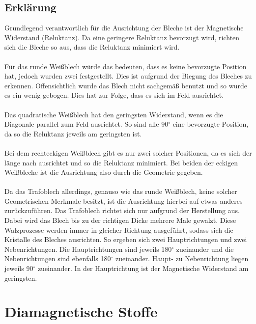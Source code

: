\documentclass[a4paper,twoside,12pt,DIV=13,BCOR=5mm,numbers=noenddot,cleardoublepage=empty]{scrbook}
\begin{document}
        \subsection{Erkl\"arung}
        Grundlegend verantwortlich f\"ur die Ausrichtung der Bleche ist der Magnetische Widerstand (Reluktanz). Da eine geringere Reluktanz bevorzugt wird, richten sich die Bleche so aus, dass die Reluktanz minimiert wird. 
        \\
        \\
        F\"ur das runde Wei\ss{}blech w\"urde das bedeuten, dass es keine bevorzugte Position hat, jedoch wurden zwei festgestellt. Dies ist aufgrund der Biegung des Bleches zu erkennen. Offensichtlich wurde das Blech nicht sachgem\"a\ss{} benutzt und so wurde es ein wenig gebogen. Dies hat zur Folge, dass es sich im Feld ausrichtet.
        \\
        \\
        Das quadratische Wei\ss{}blech hat den geringsten Widerstand, wenn es die Diagonale parallel zum Feld ausrichtet. So sind alle 90$^{\circ}$ eine bevorzugte Position, da so die Reluktanz jeweils am geringsten ist.
        \\
        \\
        Bei dem rechteckigen Wei\ss{}blech gibt es nur zwei solcher Positionen, da es sich der l\"ange nach ausrichtet und so die Reluktanz minimiert. Bei beiden der eckigen Wei\ss{}bleche ist die Ausrichtung also durch die Geometrie gegeben.
        \\
        \\
        Da das Trafoblech allerdings, genauso wie das runde Wei\ss{}blech, keine solcher Geometrischen Merkmale besitzt, ist die Ausrichtung hierbei auf etwas anderes zur\"uckzuf\"uhren. Das Trafoblech richtet sich nur aufgrund  der Herstellung aus. Dabei wird das Blech bis zu der richtigen Dicke mehrere Male gewalzt. Diese Walzprozesse werden immer in gleicher Richtung ausgef\"uhrt, sodass sich die Kristalle des Bleches ausrichten. So ergeben sich zwei Hauptrichtungen und zwei Nebenrichtungen. Die Hauptrichtungen sind jeweils 180$^{\circ}$ zueinander und die Nebenrichtungen sind ebenfalls 180$^{\circ}$ zueinander. Haupt- zu Nebenrichtung liegen jeweils 90$^{\circ}$ zueinander. In der Hauptrichtung ist der Magnetische Widerstand am geringsten.
    \section{Diamagnetische Stoffe}
\end{document}
